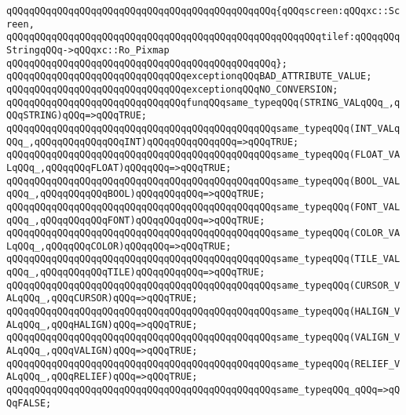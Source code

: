 \verb|qQQqqQQqqQQqqQQqqQQqqQQqqQQqqQQqqQQqqQQqqQQqqQQq{qQQqscreen:qQQqxc::Screen,|\newline
\verb|qQQqqQQqqQQqqQQqqQQqqQQqqQQqqQQqqQQqqQQqqQQqqQQqqQQqqQQqtilef:qQQqqQQqStringqQQq->qQQqxc::Ro_Pixmap|\newline
\verb|qQQqqQQqqQQqqQQqqQQqqQQqqQQqqQQqqQQqqQQqqQQqqQQq};|\newline
\newline
\verb|qQQqqQQqqQQqqQQqqQQqqQQqqQQqqQQqexceptionqQQqBAD_ATTRIBUTE_VALUE;|\newline
\verb|qQQqqQQqqQQqqQQqqQQqqQQqqQQqqQQqexceptionqQQqNO_CONVERSION;|\newline
\newline
\verb|qQQqqQQqqQQqqQQqqQQqqQQqqQQqqQQqfunqQQqsame_typeqQQq(STRING_VALqQQq_,qQQqSTRING)qQQq=>qQQqTRUE;|\newline
\verb|qQQqqQQqqQQqqQQqqQQqqQQqqQQqqQQqqQQqqQQqqQQqqQQqsame_typeqQQq(INT_VALqQQq_,qQQqqQQqqQQqqQQqINT)qQQqqQQqqQQqqQQq=>qQQqTRUE;|\newline
\verb|qQQqqQQqqQQqqQQqqQQqqQQqqQQqqQQqqQQqqQQqqQQqqQQqsame_typeqQQq(FLOAT_VALqQQq_,qQQqqQQqFLOAT)qQQqqQQq=>qQQqTRUE;|\newline
\verb|qQQqqQQqqQQqqQQqqQQqqQQqqQQqqQQqqQQqqQQqqQQqqQQqsame_typeqQQq(BOOL_VALqQQq_,qQQqqQQqqQQqBOOL)qQQqqQQqqQQq=>qQQqTRUE;|\newline
\verb|qQQqqQQqqQQqqQQqqQQqqQQqqQQqqQQqqQQqqQQqqQQqqQQqsame_typeqQQq(FONT_VALqQQq_,qQQqqQQqqQQqFONT)qQQqqQQqqQQq=>qQQqTRUE;|\newline
\verb|qQQqqQQqqQQqqQQqqQQqqQQqqQQqqQQqqQQqqQQqqQQqqQQqsame_typeqQQq(COLOR_VALqQQq_,qQQqqQQqCOLOR)qQQqqQQq=>qQQqTRUE;|\newline
\verb|qQQqqQQqqQQqqQQqqQQqqQQqqQQqqQQqqQQqqQQqqQQqqQQqsame_typeqQQq(TILE_VALqQQq_,qQQqqQQqqQQqTILE)qQQqqQQqqQQq=>qQQqTRUE;|\newline
\verb|qQQqqQQqqQQqqQQqqQQqqQQqqQQqqQQqqQQqqQQqqQQqqQQqsame_typeqQQq(CURSOR_VALqQQq_,qQQqCURSOR)qQQq=>qQQqTRUE;|\newline
\verb|qQQqqQQqqQQqqQQqqQQqqQQqqQQqqQQqqQQqqQQqqQQqqQQqsame_typeqQQq(HALIGN_VALqQQq_,qQQqHALIGN)qQQq=>qQQqTRUE;|\newline
\verb|qQQqqQQqqQQqqQQqqQQqqQQqqQQqqQQqqQQqqQQqqQQqqQQqsame_typeqQQq(VALIGN_VALqQQq_,qQQqVALIGN)qQQq=>qQQqTRUE;|\newline
\verb|qQQqqQQqqQQqqQQqqQQqqQQqqQQqqQQqqQQqqQQqqQQqqQQqsame_typeqQQq(RELIEF_VALqQQq_,qQQqRELIEF)qQQq=>qQQqTRUE;|\newline
\verb|qQQqqQQqqQQqqQQqqQQqqQQqqQQqqQQqqQQqqQQqqQQqqQQqsame_typeqQQq_qQQq=>qQQqFALSE;|\newline
